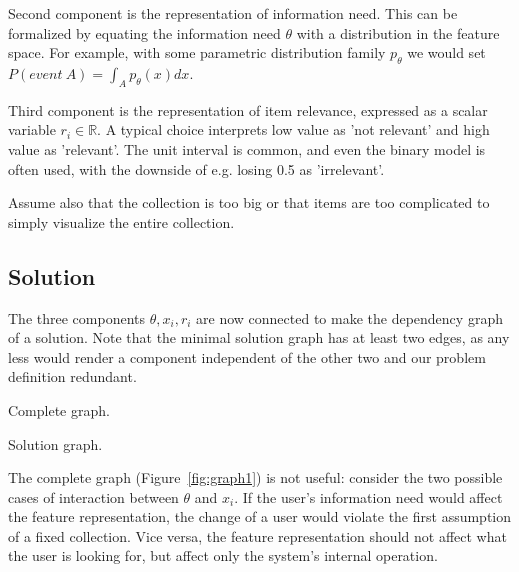 \documentclass[10pt]{tufte-handout}
\begin{document}
Second component is the representation of information need. This can be formalized by equating the information need $\theta$ with a distribution in the feature space. For example, with some parametric distribution family $p_\theta$ we would set $P(event\ A) = \int_A p_\theta (x) dx$.

Third component is the representation of item relevance, expressed as a scalar variable $r_i\in \mathbb R$. A typical choice interprets low value as 'not relevant' and high value as 'relevant'. The unit interval is common, and even the binary model is often used, with the downside of e.g. losing 0.5 as 'irrelevant'.

Assume also that the collection is too big or that items are too complicated to simply visualize the entire collection.

\subsection{Solution}
The three components $ \theta, x_i, r_i$ are now connected to make the dependency graph of a solution. Note that the minimal solution graph has at least two edges, as any less would render a component independent of the other two and our problem definition redundant.

\begin{marginfigure}%
\caption{Complete graph.}
\label{fig:graph1}
\end{marginfigure}

\begin{marginfigure}%
\caption{Solution graph.}
\label{fig:graph2}
\end{marginfigure}

The complete graph (Figure~\ref{fig:graph1}) is not useful: consider
the two possible cases of interaction between $\theta$ and $x_i$. If the user's information need would
affect the feature representation, the change of a user would violate
the first assumption of a fixed collection. Vice versa, the feature
representation should not affect what the user is looking for, but
affect only the system's internal operation. 
\end{document}
